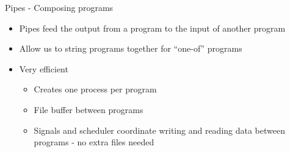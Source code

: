 \documentclass[t]{beamer}
\begin{document}

\begin{frame}{Pipes - Composing programs}
  \begin{itemize}
  \item Pipes feed the output from a program to the input of another program
  \item Allow us to string programs together for ``one-of'' programs
  \item Very efficient 
    \begin{itemize}
    \item Creates one process per program
    \item File buffer between programs
    \item Signals and scheduler coordinate writing and reading data
      between programs - no extra files needed
    \end{itemize}
  \end{itemize}
  \note{}
\end{frame}
\end{document}
